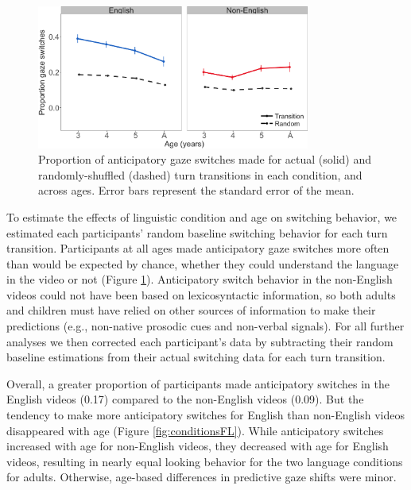 \documentclass[authoryear, 12pt]{elsarticle}
\begin{document}
\begin{figure}[t]
\begin{center}
\includegraphics[width=0.8\textwidth]{figures/FIG-randvsreal-FL.png}
\end{center}
\caption{Proportion of anticipatory gaze switches made for actual (solid) and randomly-shuffled (dashed) turn transitions in each condition, and across ages. Error bars represent the standard error of the mean.} 
\label{fig:randvsrealFL}
\end{figure}

To estimate the effects of linguistic condition and age on switching behavior, we estimated each participants' random baseline switching behavior for each turn transition. Participants at all ages made anticipatory gaze switches more often than would be expected by chance, whether they could understand the language in the video or not (Figure \ref{fig:randvsrealFL}). Anticipatory switch behavior in the non-English videos could not have been based on lexicosyntactic information, so both adults and children must have relied on other sources of information to make their predictions (e.g., non-native prosodic cues and non-verbal signals). For all further analyses we then corrected each participant's data by subtracting their random baseline estimations from their actual switching data for each turn transition.

Overall, a greater proportion of participants made anticipatory switches in the English videos (0.17) compared to the non-English videos (0.09). But the tendency to make more anticipatory switches for English than non-English videos disappeared with age (Figure \ref{fig:conditionsFL}). While anticipatory switches increased with age for non-English videos, they decreased with age for English videos, resulting in nearly equal looking behavior for the two language conditions for adults. Otherwise, age-based differences in predictive gaze shifts were minor.
\end{document}
